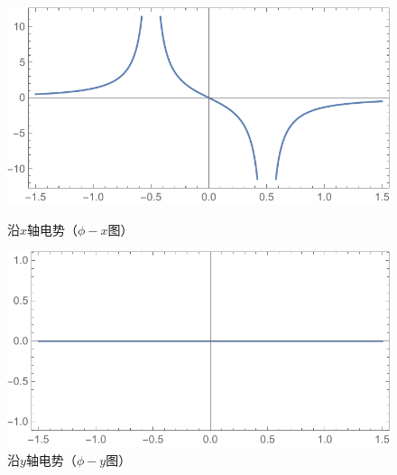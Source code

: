 \begin{figure}[H]
\begin{minipage}[b]{0.4\linewidth}
\centering
\includegraphics[width=\textwidth]{pic_data/Y/phix.pdf}
\caption{沿$x$轴电势（$\phi - x$图）}
\end{minipage}
\hfill
\begin{minipage}[b]{0.4\linewidth}
\centering
\includegraphics[width=\textwidth]{pic_data/Y/phiy.pdf}
\caption{沿$y$轴电势（$\phi - y$图）}
\end{minipage}
\end{figure}

